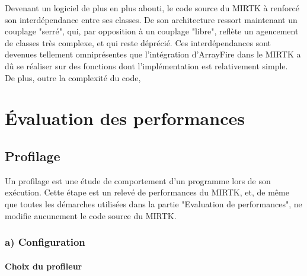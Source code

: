 \documentclass[10pt]{report}
\begin{document}
	Devenant un logiciel de plus en plus abouti, le code source du MIRTK à renforcé son interdépendance entre ses classes. De son architecture ressort maintenant un couplage "serré", qui, par opposition à un couplage "libre", reflète un agencement de classes très complexe, et qui reste déprécié. Ces interdépendances sont devenues tellement omniprésentes que l'intégration d'ArrayFire dans le MIRTK a dû se réaliser sur des fonctions dont l'implémentation est relativement simple. \\
	
	De plus, outre la complexité du code, 
	
	
	

	
	\section{Évaluation des performances}
		\subsection{Profilage}
Un profilage est une étude de comportement d'un programme lors de son exécution. Cette étape est un relevé de performances du MIRTK, et, de même que toutes les démarches utilisées dans la partie "Evaluation de performances", ne modifie aucunement le code source du MIRTK. 

		\subsubsection{a) Configuration}
			\paragraph{Choix du profileur}~\par
\end{document}
